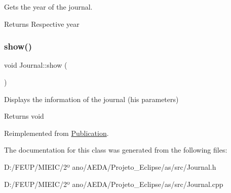 Gets the year of the journal. 

\begin{DoxyReturn}{Returns}
Respective year 
\end{DoxyReturn}
\mbox{\label{class_journal_a7131809f3865fbdcbba5f38996d29c7a}} 
\subsubsection{\texorpdfstring{show()}{show()}}
{\footnotesize\ttfamily void Journal\+::show (\begin{DoxyParamCaption}{ }\end{DoxyParamCaption})\hspace{0.3cm}{\ttfamily [virtual]}}



Displays the information of the journal (his parameters) 

\begin{DoxyReturn}{Returns}
void 
\end{DoxyReturn}


Reimplemented from \hyperlink{class_publication_aa4240a04fcecd6257e0d1a33e8f18ff0}{Publication}.



The documentation for this class was generated from the following files\+:\begin{DoxyCompactItemize}
\item 
D\+:/\+F\+E\+U\+P/\+M\+I\+E\+I\+C/2º ano/\+A\+E\+D\+A/\+Projeto\+\_\+\+Eclipse/as/src/Journal.\+h\item 
D\+:/\+F\+E\+U\+P/\+M\+I\+E\+I\+C/2º ano/\+A\+E\+D\+A/\+Projeto\+\_\+\+Eclipse/as/src/Journal.\+cpp\end{DoxyCompactItemize}
